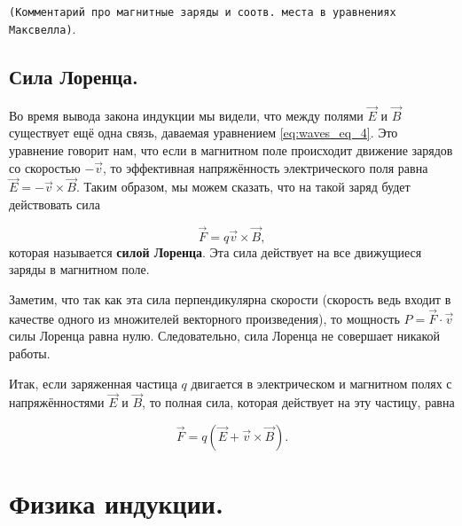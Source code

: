 \documentclass[a4paper,12pt]{article}
\newcommand{\com}[1]{{\Large{\texttt{{\color{red}(#1)}}}}}
\begin{document}
\com{Комментарий про магнитные заряды и соотв. места в уравнениях
  Максвелла}. 

\subsection{Сила Лоренца.}
\label{sec:lorentz_force}

Во время вывода закона индукции мы видели, что между полями $\vec{E}$
и $\vec{B}$ существует ещё одна связь, даваемая уравнением
\eqref{eq:waves_eq_4}. Это уравнение говорит нам, что если в магнитном
поле происходит движение зарядов со скоростью $-\vec{v}$, то
эффективная напряжённость электрического поля равна $\vec{E} =
-\vec{v} \times \vec{B}$. Таким образом, мы можем сказать, что на
такой заряд будет действовать сила

\begin{equation}
  \label{eq:lorentz_force}
  \vec{F} = q \vec{v} \times \vec{B},
\end{equation}
которая называется \textbf{силой Лоренца}. Эта сила действует на все
движущиеся заряды в магнитном поле. 

Заметим, что так как эта сила перпендикулярна скорости (скорость ведь
входит в качестве одного из множителей векторного произведения), то
мощность $P = \vec{F} \cdot \vec{v} $ силы Лоренца равна
нулю. Следовательно, сила Лоренца не совершает никакой работы. 

Итак, если заряженная частица $q$ двигается в электрическом и
магнитном полях с напряжённостями $\vec{E}$ и $\vec{B}$, то полная
сила, которая действует на эту частицу, равна

\begin{equation}
  \label{eq:lorentz_force_full}
  \vec{F} = q \left( \vec{E} + \vec{v} \times \vec{B} \right). 
\end{equation}

\section{Физика индукции.}
\label{sec:induction}







\end{document}
